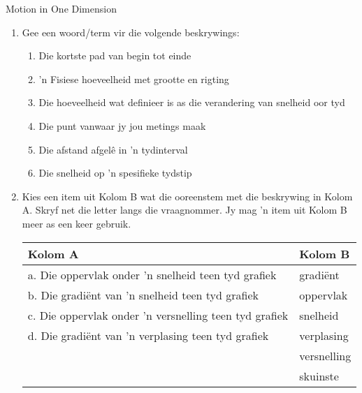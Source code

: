 \begin{eocexercises}{Motion in One Dimension}
\nopagebreak \noindent
    \begin{enumerate}[noitemsep, label=\textbf{\arabic*}. ] 
    \item Gee een woord/term vir die volgende beskrywings:
    \begin{enumerate}[noitemsep, label=\textbf{\alph*}. ] 
        \item Die kortste pad van begin tot einde
        \item 'n Fisiese hoeveelheid met grootte en rigting
        \item Die hoeveelheid wat definieer is as die verandering van snelheid oor tyd
        \item Die punt vanwaar jy jou metings maak
        \item Die afstand afgel\^e in 'n tydinterval
        \item Die snelheid op 'n spesifieke tydstip
    \end{enumerate}
    \item Kies een item uit Kolom B wat die ooreenstem met die beskrywing in Kolom A. Skryf net die letter langs die vraagnommer. Jy mag 'n item uit Kolom B meer as een keer gebruik.
              \begin{table}[H]
            \begin{center}
          \label{m38796*uid180}
        \noindent
          \begin{tabular}{|l|l|}\hline
            Kolom A &
            Kolom B \\ \hline
            a. Die oppervlak onder 'n snelheid teen tyd grafiek &
            gradi\"ent \\ \hline
            b. Die gradi\"ent van 'n snelheid teen tyd grafiek &
            oppervlak\\ \hline
            c. Die oppervlak onder 'n versnelling teen tyd grafiek &
            snelheid\\ \hline
            d. Die gradi\"ent van 'n verplasing teen tyd grafiek &
            verplasing \\ \hline
             &
            versnelling\\ \hline
             &
            skuinste \\ \hline
        \end{tabular}
          \end{center}
    \end{table}
        \par
    

\end{enumerate}
\end{eocexercises}
